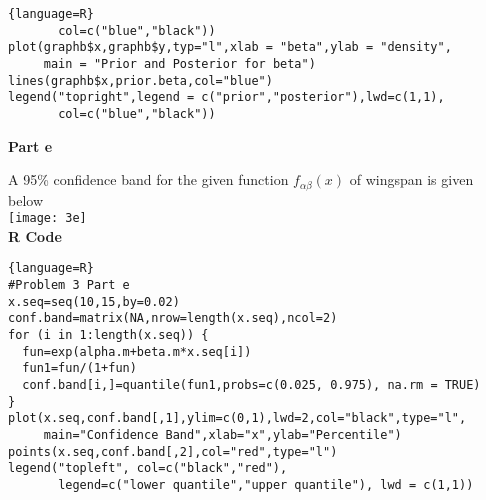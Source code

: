\documentclass[12pt]{article}
\newenvironment{problem}[2][Problem]{\begin{trivlist}
\item[\hskip \labelsep {\bfseries #1}\hskip \labelsep {\bfseries #2.}]}{\end{trivlist}}
\begin{document}
\begin{problem}{3}
\begin{lstlisting}{language=R}
       col=c("blue","black"))
plot(graphb$x,graphb$y,typ="l",xlab = "beta",ylab = "density", 
     main = "Prior and Posterior for beta")
lines(graphb$x,prior.beta,col="blue")
legend("topright",legend = c("prior","posterior"),lwd=c(1,1), 
       col=c("blue","black"))
\end{lstlisting}
\newpage
\begin{flushleft}
\textbf{Part e}\\
\end{flushleft}
A 95\% confidence band for the given function $f_{\alpha\beta}(x)$  of wingspan is given below\\
\texttt{[image: 3e]}\\
\textbf{R Code}
\begin{lstlisting}{language=R}
#Problem 3 Part e
x.seq=seq(10,15,by=0.02) 
conf.band=matrix(NA,nrow=length(x.seq),ncol=2) 
for (i in 1:length(x.seq)) {
  fun=exp(alpha.m+beta.m*x.seq[i])
  fun1=fun/(1+fun) 
  conf.band[i,]=quantile(fun1,probs=c(0.025, 0.975), na.rm = TRUE) 
}
plot(x.seq,conf.band[,1],ylim=c(0,1),lwd=2,col="black",type="l", 
     main="Confidence Band",xlab="x",ylab="Percentile")
points(x.seq,conf.band[,2],col="red",type="l")
legend("topleft", col=c("black","red"), 
       legend=c("lower quantile","upper quantile"), lwd = c(1,1))
\end{lstlisting}
\end{problem}
\end{document}
